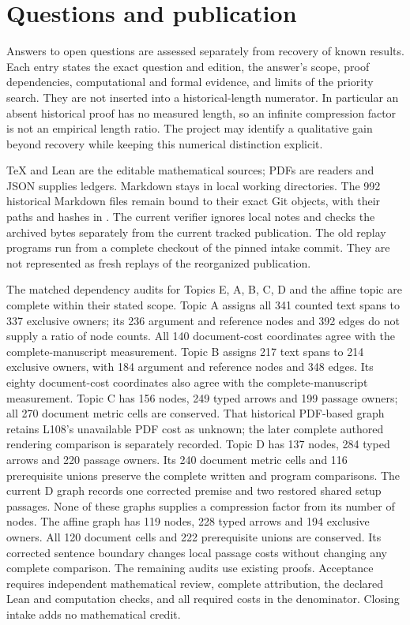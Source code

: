 \documentclass[11pt,a4paper]{article}
\begin{document}
\section{Questions and publication}

Answers to open questions are assessed separately from recovery of known
results. Each entry states the exact question and edition, the answer's
scope, proof dependencies, computational and formal evidence, and limits
of the priority search. They are not inserted into a historical-length
numerator. In particular an absent historical proof has no measured
length, so an infinite compression factor is not an empirical length
ratio. The project may identify a qualitative gain beyond recovery while
keeping this numerical distinction explicit.

TeX and Lean are the editable mathematical sources; PDFs are readers and
JSON supplies ledgers. Markdown stays in local working directories.
The 992 historical Markdown files remain bound to their exact Git objects,
with their paths and hashes in .
The current verifier ignores local notes and checks the archived bytes
separately from the current tracked publication. The old replay programs
run from a complete checkout of the pinned intake commit. They are not
represented as fresh replays of the reorganized publication.

The matched dependency audits for Topics E, A, B, C, D and the affine topic
are complete within their stated scope. Topic A assigns all 341 counted
text spans to 337 exclusive owners; its 236 argument and reference nodes
and 392 edges do not supply a ratio of node counts. All 140 document-cost
coordinates agree with the complete-manuscript measurement.
Topic B assigns 217 text spans to 214 exclusive owners, with 184 argument
and reference nodes and 348 edges. Its eighty document-cost coordinates
also agree with the complete-manuscript measurement.
Topic C has 156 nodes, 249 typed arrows and 199 passage owners; all
270 document metric cells are conserved. That historical PDF-based graph
retains L108's unavailable PDF cost as unknown; the later complete authored
rendering comparison is separately recorded. Topic D has 137 nodes, 284
typed arrows and 220 passage owners.
Its 240 document metric cells and 116 prerequisite unions preserve the
complete written and program comparisons. The current D graph records
one corrected premise and two restored shared setup passages. None of
these graphs supplies a compression factor from its number of nodes.
The affine graph has 119 nodes, 228 typed arrows and 194 exclusive owners.
All 120 document cells and 222 prerequisite unions are conserved. Its
corrected sentence boundary changes local passage costs without changing
any complete comparison.
The remaining audits use existing proofs. Acceptance requires independent
mathematical review, complete attribution, the declared Lean and computation
checks, and all required costs in the denominator. Closing intake adds no
mathematical credit.
\end{document}
